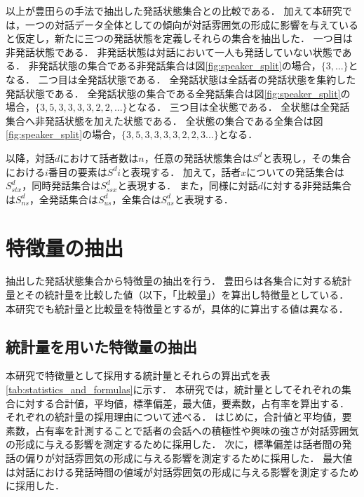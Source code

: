 以上が豊田らの手法で抽出した発話状態集合との比較である．
加えて本研究では，一つの対話データ全体としての傾向が対話雰囲気の形成に影響を与えていると仮定し，新たに三つの発話状態を定義しそれらの集合を抽出した．
一つ目は非発話状態である．
非発話状態は対話において一人も発話していない状態である．
非発話状態の集合である非発話集合は図\ref{fig:speaker_split}の場合，$\{3, ...\}$となる．
二つ目は全発話状態である．
全発話状態は全話者の発話状態を集約した発話状態である．
全発話状態の集合である全発話集合は図\ref{fig:speaker_split}の場合，$\{3, 5, 3, 3, 3, 3, 2, 2, ...\}$となる．
三つ目は全状態である．
全状態は全発話集合へ非発話状態を加えた状態である．
全状態の集合である全集合は図\ref{fig:speaker_split}の場合，$\{3, 5, 3, 3, 3, 3, 2, 2, 3 ...\}$となる．

以降，対話$d$におけて話者数は$n$，任意の発話状態集合は$S^d$と表現し，その集合における$i$番目の要素は$S^di$と表現する．
加えて，話者$x$についての発話集合は$S^d_{stx}$，同時発話集合は$S^d_{ssx}$と表現する．
また，同様に対話$d$に対する非発話集合は$S^d_{ns}$，全発話集合は$S^d_{us}$，全集合は$S^d_{as}$と表現する．

\section{特徴量の抽出}

抽出した発話状態集合から特徴量の抽出を行う．
豊田らは各集合に対する統計量とその統計量を比較した値（以下，「比較量」）を算出し特徴量としている．
本研究でも統計量と比較量を特徴量とするが，具体的に算出する値は異なる．

\subsection{統計量を用いた特徴量の抽出}

本研究で特徴量として採用する統計量とそれらの算出式を表\ref{tab:statistics_and_formulas}に示す．
本研究では，統計量としてそれぞれの集合に対する合計値，平均値，標準偏差，最大値，要素数，占有率を算出する．
それぞれの統計量の採用理由について述べる．
はじめに，合計値と平均値，要素数，占有率を計測することで話者の会話への積極性や興味の強さが対話雰囲気の形成に与える影響を測定するために採用した．
次に，標準偏差は話者間の発話の偏りが対話雰囲気の形成に与える影響を測定するために採用した．
最大値は対話における発話時間の値域が対話雰囲気の形成に与える影響を測定するために採用した．

